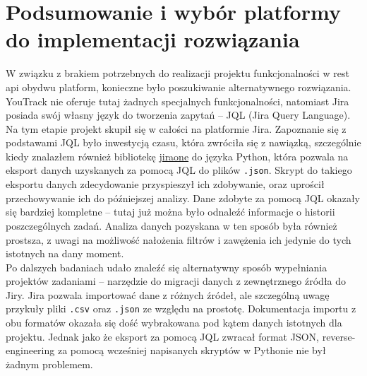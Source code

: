 \section{Podsumowanie i wybór platformy do implementacji rozwiązania}
W związku z brakiem potrzebnych do realizacji projektu funkcjonalności w rest api obydwu platform, konieczne było poszukiwanie alternatywnego rozwiązania.
YouTrack nie oferuje tutaj żadnych specjalnych funkcjonalności, natomiast Jira posiada swój własny język do tworzenia zapytań -- JQL (Jira Query Language). \cite{YouTrackSearch} \cite{JiraJQL}
Na tym etapie projekt skupił się w całości na platformie Jira. Zapoznanie się z podstawami JQL było inwestycją czasu, która zwróciła się z nawiązką, szczególnie kiedy znalazłem również bibliotekę \href{https://pypi.org/project/jiraone/}{jiraone} do języka Python,
która pozwala na eksport danych uzyskanych za pomocą JQL do plików \texttt{.json}. Skrypt do takiego eksportu danych zdecydowanie przyspieszył ich zdobywanie, oraz uprościł przechowywanie ich do późniejszej analizy.
Dane zdobyte za pomocą JQL okazały się bardziej kompletne -- tutaj już można było odnaleźć informacje o historii poszczególnych zadań. Analiza danych pozyskana w ten sposób była również prostsza, z uwagi na możliwość nałożenia filtrów i zawężenia ich
jedynie do tych istotnych na dany moment.\\
Po dalszych badaniach udało znaleźć się alternatywny sposób wypełniania projektów zadaniami -- narzędzie do migracji danych z zewnętrznego źródła do Jiry. \cite{JiraImportExport}
Jira pozwala importować dane z różnych źródeł, ale szczególną uwagę przykuły pliki \texttt{.csv} oraz \texttt{.json} ze względu na prostotę.
Dokumentacja importu z obu formatów okazała się dość wybrakowana pod kątem danych istotnych dla projektu. Jednak jako że eksport za pomocą JQL zwracał format JSON, reverse-engineering za pomocą wcześniej napisanych skryptów w Pythonie nie był
żadnym problemem.
